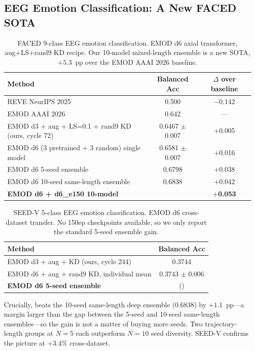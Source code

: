 \subsection{EEG Emotion Classification: A New FACED SOTA}
\label{sec:faced}

\begin{table}[h]
\centering
\caption{FACED 9-class EEG emotion classification. EMOD d6 axial transformer,
aug+LS+rand9 KD recipe. Our 10-model mixed-length ensemble is a new SOTA,
$+5.3$~pp over the EMOD AAAI 2026 baseline.}
\label{tab:faced}
\begin{tabular}{lcc}
\toprule
Method & Balanced Acc & $\Delta$ over baseline \\
\midrule
REVE NeurIPS 2025 \cite{kostas2025reve} & 0.500 & $-$0.142 \\
EMOD AAAI 2026 \cite{chen2026emod} & 0.642 & --- \\
EMOD d3 + aug + LS=0.1 + rand9 KD (ours, cycle 72) & 0.6467 $\pm$ 0.007 & $+$0.005 \\
EMOD d6 (3 pretrained + 3 random) single model & 0.6581 $\pm$ 0.007 & $+$0.016 \\
EMOD d6 5-seed ensemble & 0.6798 & $+$0.038 \\
EMOD d6 10-seed same-length ensemble & 0.6838 & $+$0.042 \\
\rowcolor{blond}
\textbf{EMOD d6 + d6\_e150 10-model \ours{}} & \textbf{\facedacc{}} & \textbf{$+$0.053} \\
\bottomrule
\end{tabular}
\end{table}

\begin{table}[h]
\centering
\caption{SEED-V 5-class EEG emotion classification. EMOD d6 cross-dataset
transfer. No 150ep checkpoints available, so we only report the standard
5-seed ensemble gain.}
\label{tab:seedv}
\begin{tabular}{lc}
\toprule
Method & Balanced Acc \\
\midrule
EMOD d3 + aug + KD (ours, cycle 244) & 0.3744 \\
EMOD d6 + aug + rand9 KD, individual mean & 0.3743 $\pm$ 0.006 \\
\rowcolor{blond}
\textbf{EMOD d6 5-seed ensemble} & \textbf{\seedvacc{}} (\seedvgain{}) \\
\bottomrule
\end{tabular}
\end{table}

Crucially, \ours{} beats the 10-seed same-length deep ensemble
($0.6838$) by $+1.1$~pp---a margin larger than the gap between the
5-seed and 10-seed same-length ensembles---so the gain is not a matter
of buying more seeds. Two trajectory-length groups at
$N{=}5$ each outperform $N{=}10$ seed diversity. SEED-V confirms the
picture at $+3.4\%$ cross-dataset.

